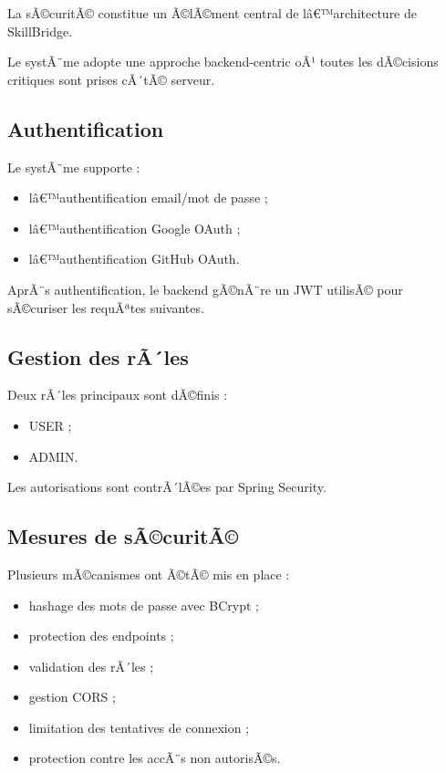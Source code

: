﻿\documentclass[12pt,a4paper]{report}
\begin{document}
La sÃ©curitÃ© constitue un Ã©lÃ©ment central de lâ€™architecture de SkillBridge.

Le systÃ¨me adopte une approche backend-centric oÃ¹ toutes les dÃ©cisions critiques sont prises cÃ´tÃ© serveur.

\subsection{Authentification}

Le systÃ¨me supporte :
\begin{itemize}
    \item lâ€™authentification email/mot de passe ;
    \item lâ€™authentification Google OAuth ;
    \item lâ€™authentification GitHub OAuth.
\end{itemize}

AprÃ¨s authentification, le backend gÃ©nÃ¨re un JWT utilisÃ© pour sÃ©curiser les requÃªtes suivantes.

\subsection{Gestion des rÃ´les}

Deux rÃ´les principaux sont dÃ©finis :
\begin{itemize}
    \item USER ;
    \item ADMIN.
\end{itemize}

Les autorisations sont contrÃ´lÃ©es par Spring Security.

\subsection{Mesures de sÃ©curitÃ©}

Plusieurs mÃ©canismes ont Ã©tÃ© mis en place :
\begin{itemize}
    \item hashage des mots de passe avec BCrypt ;
    \item protection des endpoints ;
    \item validation des rÃ´les ;
    \item gestion CORS ;
    \item limitation des tentatives de connexion ;
    \item protection contre les accÃ¨s non autorisÃ©s.
\end{itemize}
\end{document}
